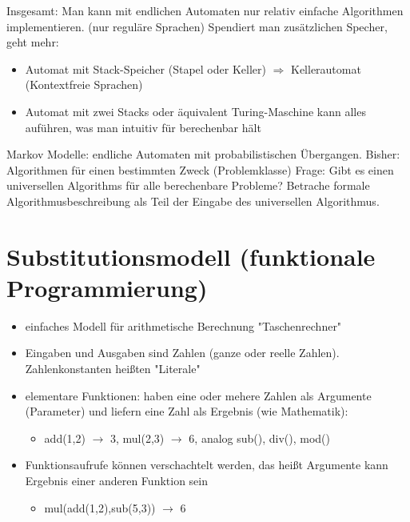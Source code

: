 \documentclass[a4paper]{scrartcl}
\begin{document}
Insgesamt: Man kann mit endlichen Automaten nur relativ einfache Algorithmen implementieren. (nur reguläre Sprachen)
Spendiert man zusätzlichen Specher, geht mehr:
\begin{itemize}
\item Automat mit Stack-Speicher (Stapel oder Keller) $\Rightarrow$ Kellerautomat (Kontextfreie Sprachen)
\item Automat mit zwei Stacks oder äquivalent Turing-Maschine kann alles auführen, was man intuitiv für berechenbar hält
\end{itemize}
Markov Modelle: endliche Automaten mit probabilistischen Übergangen.
Bisher: Algorithmen für einen bestimmten Zweck (Problemklasse)
Frage: Gibt es einen universellen Algorithms für alle berechenbare Probleme?
Betrache formale Algorithmusbeschreibung als Teil der Eingabe des universellen Algorithmus.
\section{Substitutionsmodell (funktionale Programmierung)}
\label{sec-6}
\begin{itemize}
\item einfaches Modell für arithmetische Berechnung "Taschenrechner"
\item Eingaben und Ausgaben sind Zahlen (ganze oder reelle Zahlen). Zahlenkonstanten heißten "Literale"
\item elementare Funktionen: haben eine oder mehere Zahlen als Argumente (Parameter) und liefern eine Zahl als Ergebnis (wie Mathematik):
\begin{itemize}
\item add(1,2) $\rightarrow$ 3, mul(2,3) $\rightarrow$ 6, analog sub(), div(), mod()
\end{itemize}
\item Funktionsaufrufe können verschachtelt werden, das heißt Argumente kann Ergebnis einer anderen Funktion sein
\begin{itemize}
\item mul(add(1,2),sub(5,3)) $\rightarrow$ 6
\end{itemize}
\end{itemize}
\end{document}
